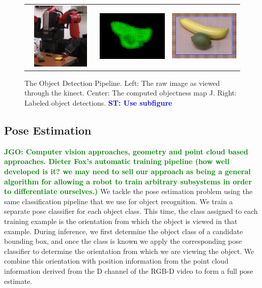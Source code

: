 \documentclass[conference]{IEEEtran}
\newcommand{\stnote}[1]{\textcolor{Blue}{\textbf{ST: #1}}}
\newcommand{\jgonote}[1]{\textcolor{Green}{\textbf{JGO: #1}}}
\begin{document}
\begin{figure}
  \begin{center}
    \begin{tabular}{l c r}
      \includegraphics[width=160px, height=120px]{kinect.png} &
      \includegraphics[width=160px, height=120px]{objectness.png} &
      \includegraphics[width=160px, height=120px]{blueBoxes.png} \\
    \end{tabular}
  \end{center}
  \caption{The Object Detection Pipeline. Left: The raw image as viewed through the kinect. 
    Center: The computed objectness map J. Right: Labeled object detections. \stnote{Use subfigure}}
\end{figure}

 
\subsection{Pose Estimation}
\jgonote{Computer vision approaches, geometry and point cloud based approaches. Dieter Fox's automatic
training pipeline (how well developed is it? we may need to sell our approach as being a 
general algorithm for allowing a robot to train arbitrary subsystems in order to differentiate 
ourselves.)}
We tackle the pose estimation problem using the same classification pipeline that we use for
object recognition. We train a separate pose classifier for each object class. This time, the class
assigned to each training example is the orientation from which the object is viewed in that example.
During inference, we first determine the object class of a candidate bounding box, and once the class
is known we apply the corresponding pose classifier to determine the orientation from which we
are viewing the object. We combine this orientation with position information from the point cloud
information derived from the D channel of the RGB-D video to form a full pose estimate.
\end{document}
